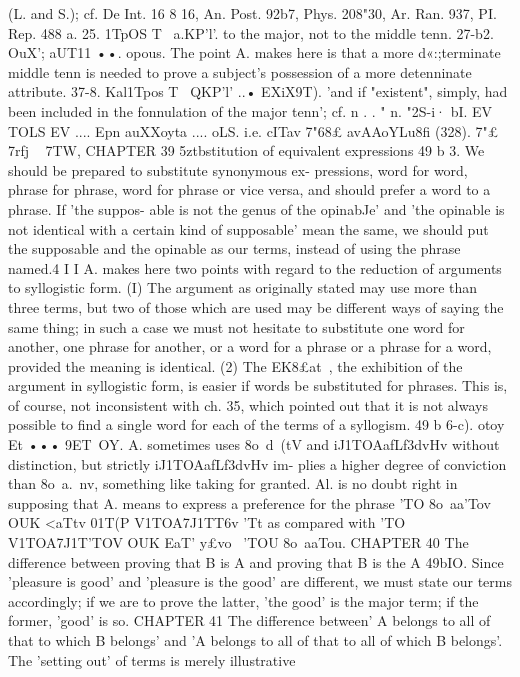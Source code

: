 {{{{{{{{{{{{{{{{{{{{{{{{{{{(L. and S.); cf. De Int. 16 8 16, An. Post. 92b7, Phys. 208"30, Ar.
Ran. 937, PI. Rep. 488 a.
25. 1TpOS T~ a.KP'l'. to the major, not to the middle tenn.
27-b2. OuX'; aUT11 ••. opous. The point A. makes here is that
a more d«:;terminate middle tenn is needed to prove a subject's
possession of a more detenninate attribute.
37-8. Kal1Tpos T~ QKP'l' ..• EXiX9T). 'and if "existent", simply,
had been included in the fonnulation of the major tenn'; cf.
n . . "
n.
"2S-{i·
bI. EV TOLS EV .... Epn auXXoyta .... oLS. i.e. cITav 7"68£
avAAoYLu8fi (328).
7"£
~
7rfj ~ 7TW,
CHAPTER 39
5ztbstitution of equivalent expressions
49 b 3. We should be prepared to substitute synonymous ex-
pressions, word for word, phrase for phrase, word for phrase or
vice versa, and should prefer a word to a phrase. If 'the suppos-
able is not the genus of the opinabJe' and 'the opinable is not
identical with a certain kind of supposable' mean the same, we
should put the supposable and the opinable as our terms, instead
of using the phrase named.4 I I
A. makes here two points with regard to the reduction of
arguments to syllogistic form. (I) The argument as originally
stated may use more than three terms, but two of those which
are used may be different ways of saying the same thing; in such
a case we must not hesitate to substitute one word for another,
one phrase for another, or a word for a phrase or a phrase for a
word, provided the meaning is identical. (2) The EK8£at~, the
exhibition of the argument in syllogistic form, is easier if words
be substituted for phrases. This is, of course, not inconsistent
with ch. 35, which pointed out that it is not always possible to
find a single word for each of the terms of a syllogism.
49 b 6-c). otoy Et ••• 9ET~OY. A. sometimes uses 8o~d~(tV and
iJ1TOAafLf3dvHv without distinction, but strictly iJ1TOAafLf3dvHv im-
plies a higher degree of conviction than 8o~a.~nv, something like
taking for granted. Al. is no doubt right in supposing that A.
means to express a preference for the phrase 'TO 8o~aa'Tov OUK
<aTtv 01T(P V1TOA7J1TT6v 'Tt as compared with 'TO V1TOA7J1T'TOV OUK EaT'
y£vo~
'TOU
8o~aaTou.
CHAPTER 40
The difference between proving that B is A and proving that B is
the A
49bIO. Since 'pleasure is good' and 'pleasure is the good' are
different, we must state our terms accordingly; if we are to prove
the latter, 'the good' is the major term; if the former, 'good' is so.
CHAPTER 41
The difference between' A belongs to all of that to which B belongs'
and 'A belongs to all of that to all of which B belongs'. The 'setting
out' of terms is merely illustrative
}}}}}}}}}}}}}}}}}}}}}}}}}}}}

